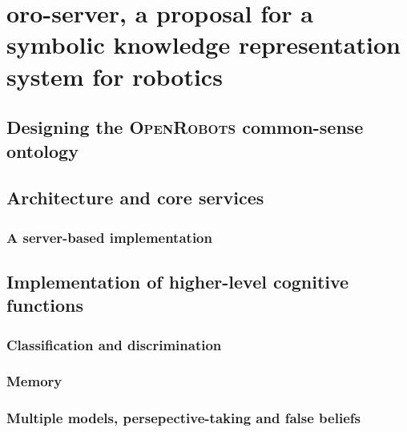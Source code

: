 \chapter{oro-server, a proposal for a symbolic knowledge representation system for robotics}
\label{chapter|oroserver}

\section{Designing the \textsc{OpenRobots} common-sense ontology}
\label{sect|commonsense-design}

\section{ Architecture and core services}
\label{sect|oro-core}

\subsection{ A server-based implementation}
\label{sect|oro-serverbased}


\section{ Implementation of higher-level cognitive functions}
\label{sect|high-level-cognition}

\subsection{Classification and discrimination}
\label{subssect|discrimination}

\subsection{Memory}
\label{subssect|memory}

\subsection{Multiple models, persepective-taking and false beliefs}
\label{subssect|alterite}

